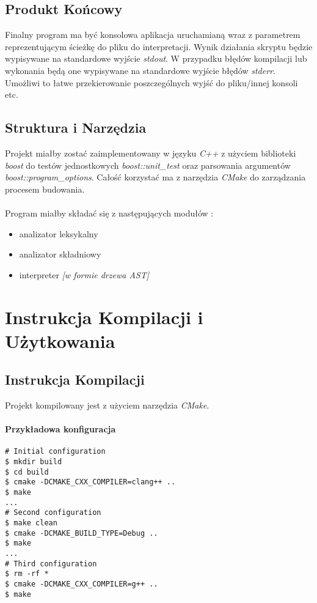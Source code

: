 \documentclass[11pt]{article} %
\begin{document}
\subsection{Produkt Końcowy}
Finalny program ma być konsolowa aplikacja uruchamianą wraz z parametrem reprezentującym ścieżkę do pliku do interpretacji. Wynik działania skryptu będzie wypisywane na standardowe wyjście \textsl{stdout}. W przypadku błędów kompilacji lub wykonania będą one wypisywane na standardowe wyjście błędów \textsl{stderr}. Umożliwi to łatwe przekierowanie poszczególnych wyjść do pliku/innej konsoli etc.
\subsection{Struktura i Narzędzia}
Projekt miałby zostać zaimplementowany w języku \textit{C++} z użyciem biblioteki \textit{boost} do testów jednostkowych \textit{boost::unit\_test} oraz parsowania argumentów \textit{boost::program\_options}. Całość korzystać ma z narzędzia \textit{CMake} do zarządzania procesem budowania.
\paragraph{}
Program miałby składać się z następujących modułów : 
\begin{itemize}
	\item analizator leksykalny
	\item analizator składniowy
	\item interpreter \textit{[w formie drzewa AST]}
\end{itemize}

\section{Instrukcja Kompilacji i Użytkowania}
\subsection{Instrukcja Kompilacji}
Projekt kompilowany jest z użyciem narzędzia \textsl{CMake}.

\paragraph{Przykładowa konfiguracja}
\begin{verbatim}
# Initial configuration
$ mkdir build
$ cd build
$ cmake -DCMAKE_CXX_COMPILER=clang++ ..
$ make
...
# Second configuration
$ make clean
$ cmake -DCMAKE_BUILD_TYPE=Debug ..
$ make
...
# Third configuration
$ rm -rf *
$ cmake -DCMAKE_CXX_COMPILER=g++ ..
$ make
\end{verbatim}
\end{document}
